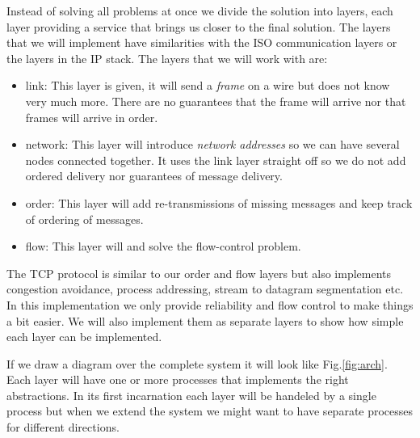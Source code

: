 \documentclass[a4paper,11pt]{article}
\begin{document}
Instead of solving all problems at once we divide the solution into
layers, each layer providing a service that brings us closer to the
final solution. The layers that we will implement have similarities
with the ISO communication layers or the layers in the IP stack. The
layers that we will work with are:

\begin{itemize}

\item link: This layer is given, it will send a {\em frame} on a
  wire but does not know very much more. There are no guarantees that the
  frame will arrive nor that frames will arrive in order.

\item network: This layer will introduce {\em network addresses} so we
  can have several nodes connected together. It uses the link layer
  straight off so we do not add ordered delivery nor guarantees of
  message delivery.

\item order: This layer will add re-transmissions of
  missing messages and keep track of ordering of messages. 
  
\item flow: This layer will and solve the flow-control problem.

\end{itemize}

The TCP protocol is similar to our order and flow layers but also
implements congestion avoidance, process addressing, stream to datagram
segmentation etc. In this implementation we only provide reliability
and flow control to make things a bit easier. We will also implement
them as separate layers to show how simple each layer can be
implemented.

If we draw a diagram over the complete system it will look like
Fig.\ref{fig:arch}. Each layer will have one or more processes that
implements the right abstractions. In its first incarnation each layer
will be handeled by a single process but when we extend the system we
might want to have separate processes for different directions.
\end{document}

